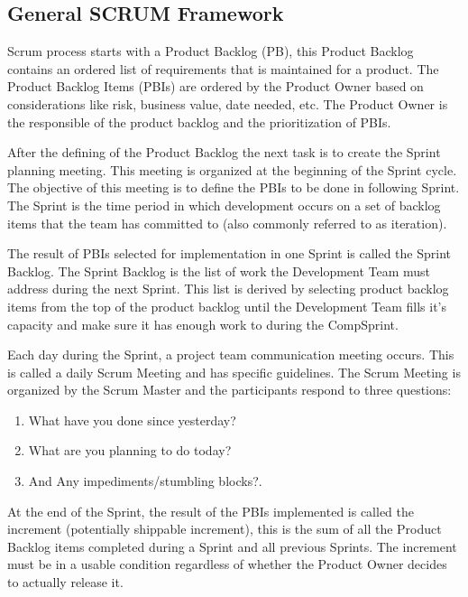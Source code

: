 \subsection{General SCRUM Framework}

Scrum process starts with a Product Backlog (PB), this Product Backlog contains an ordered list of requirements that is maintained for a product. The Product Backlog Items (PBIs) are ordered by the Product Owner based on considerations like risk, business value, date needed, etc. The Product Owner is the responsible of the product backlog and the prioritization of PBIs.

After the defining of the Product Backlog the next task is to create the Sprint planning meeting. This meeting is organized at the beginning of the Sprint cycle. The objective of this meeting is to define the PBIs to be done in following Sprint. The Sprint is the time period in which development occurs on a set of backlog items that the team has committed to (also commonly referred to as iteration). 

The result of PBIs selected for implementation in one Sprint is called the Sprint Backlog. The Sprint Backlog is the list of work the Development Team must address during the next Sprint. This list is derived by selecting product backlog items from the top of the product backlog until the Development Team fills it's capacity and make sure it has enough work to during the CompSprint.

Each day during the Sprint, a project team communication meeting occurs. This is called a daily Scrum Meeting and has specific guidelines. The Scrum Meeting is organized by the Scrum Master and the participants respond to three questions:
\begin{enumerate}
\item  What have you done since yesterday?
\item What are you planning to do today? 
\item And Any impediments/stumbling blocks?.
\end{enumerate}
At the end of the Sprint, the result of the PBIs implemented is called the increment (potentially shippable increment), this is the sum of all the Product Backlog items completed during a Sprint and all previous Sprints. The increment must be in a usable condition regardless of whether the Product Owner decides to actually release it.

